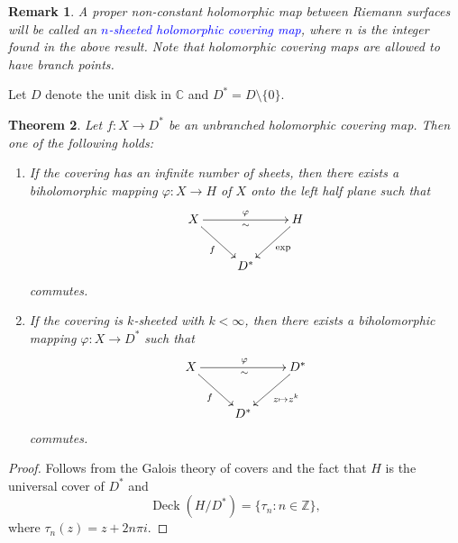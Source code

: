 \documentclass[12pt]{article}
\theoremstyle{thmstyle}
\newtheorem{theorem}{Theorem}[section]
\theoremstyle{defstyle}
\newtheorem{remark}[theorem]{Remark}
\newcommand{\Z}{\mathbb{Z}}
\newcommand{\bbC}{\mathbb{C}}
\newcommand{\define}[1]{\textcolor{blue}{\textit{#1}}}
\begin{document}
\begin{remark}
    A proper non-constant holomorphic map between Riemann surfaces will be called an \define{$n$-sheeted holomorphic covering map}, where $n$ is the integer found in the above result. Note that holomorphic covering maps are allowed to have branch points. 
\end{remark}

Let $D$ denote the unit disk in $\bbC$ and $D^\ast = D\setminus\{0\}$.

\begin{theorem}
    Let $f: X\to D^\ast$ be an unbranched holomorphic covering map. Then one of the following holds:
    \begin{enumerate}[label=(\alph*)]
        \item If the covering has an infinite number of sheets, then there exists a biholomorphic mapping $\varphi: X\to H$ of $X$ onto the left half plane such that
        \begin{equation*}
            \xymatrix{
                X\ar[rr]^\varphi_{\sim}\ar[rd]_-f & & H\ar[ld]^-{\exp}\\
                & D^\ast &
            }
        \end{equation*}
        commutes.

        \item If the covering is $k$-sheeted with $k < \infty$, then there exists a biholomorphic mapping $\varphi: X\to D^\ast$ such that 
        \begin{equation*}
            \xymatrix {
                X\ar[rr]^\varphi_{\sim}\ar[rd]_-f & & D^\ast\ar[ld]^-{z\mapsto z^k}\\
                & D^\ast & 
            }
        \end{equation*}
        commutes.
    \end{enumerate}
\end{theorem}
\begin{proof}
    Follows from the Galois theory of covers and the fact that $H$ is the universal cover of $D^\ast$ and 
    \begin{equation*}
        \operatorname{Deck}(H/D^\ast) = \{\tau_n\colon n\in\Z\},
    \end{equation*}
    where $\tau_n(z) = z + 2n\pi i$.
\end{proof}
\end{document}
